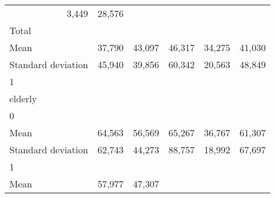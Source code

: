 \begin{tabular}{llllll}
  \multicolumn{1}{r}{3,449} &
  \multicolumn{1}{r}{28,576} \\
\multicolumn{1}{l}{\hspace{3em}Total} &
  \multicolumn{1}{|r}{} &
  \multicolumn{1}{r}{} &
  \multicolumn{1}{r}{} &
  \multicolumn{1}{r}{} &
  \multicolumn{1}{r}{} \\
\multicolumn{1}{l}{\hspace{4em}Mean} &
  \multicolumn{1}{|r}{37,790} &
  \multicolumn{1}{r}{43,097} &
  \multicolumn{1}{r}{46,317} &
  \multicolumn{1}{r}{34,275} &
  \multicolumn{1}{r}{41,030} \\
\multicolumn{1}{l}{\hspace{4em}Standard deviation} &
  \multicolumn{1}{|r}{45,940} &
  \multicolumn{1}{r}{39,856} &
  \multicolumn{1}{r}{60,342} &
  \multicolumn{1}{r}{20,563} &
  \multicolumn{1}{r}{48,849} \\
\multicolumn{1}{l}{\hspace{1em}1} &
  \multicolumn{1}{|r}{} &
  \multicolumn{1}{r}{} &
  \multicolumn{1}{r}{} &
  \multicolumn{1}{r}{} &
  \multicolumn{1}{r}{} \\
\multicolumn{1}{l}{\hspace{2em}elderly} &
  \multicolumn{1}{|r}{} &
  \multicolumn{1}{r}{} &
  \multicolumn{1}{r}{} &
  \multicolumn{1}{r}{} &
  \multicolumn{1}{r}{} \\
\multicolumn{1}{l}{\hspace{3em}0} &
  \multicolumn{1}{|r}{} &
  \multicolumn{1}{r}{} &
  \multicolumn{1}{r}{} &
  \multicolumn{1}{r}{} &
  \multicolumn{1}{r}{} \\
\multicolumn{1}{l}{\hspace{4em}Mean} &
  \multicolumn{1}{|r}{64,563} &
  \multicolumn{1}{r}{56,569} &
  \multicolumn{1}{r}{65,267} &
  \multicolumn{1}{r}{36,767} &
  \multicolumn{1}{r}{61,307} \\
\multicolumn{1}{l}{\hspace{4em}Standard deviation} &
  \multicolumn{1}{|r}{62,743} &
  \multicolumn{1}{r}{44,273} &
  \multicolumn{1}{r}{88,757} &
  \multicolumn{1}{r}{18,992} &
  \multicolumn{1}{r}{67,697} \\
\multicolumn{1}{l}{\hspace{3em}1} &
  \multicolumn{1}{|r}{} &
  \multicolumn{1}{r}{} &
  \multicolumn{1}{r}{} &
  \multicolumn{1}{r}{} &
  \multicolumn{1}{r}{} \\
\multicolumn{1}{l}{\hspace{4em}Mean} &
  \multicolumn{1}{|r}{57,977} &
  \multicolumn{1}{r}{47,307} &

\end{tabular}
